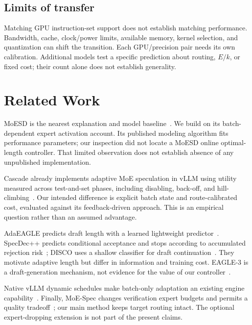\documentclass[10pt,twocolumn]{article}
\begin{document}
\subsection{Limits of transfer}
Matching GPU instruction-set support does not establish matching performance. Bandwidth, cache, clock/power limits, available memory, kernel selection, and quantization can shift the transition. Each GPU/precision pair needs its own calibration. Additional models test a specific prediction about routing, $E/k$, or fixed cost; their count alone does not establish generality.

\section{Related Work}
MoESD is the nearest explanation and model baseline~\cite{moesd}. We build on its batch-dependent expert activation account. Its published modeling algorithm fits performance parameters; our inspection did not locate a MoESD online optimal-length controller. That limited observation does not establish absence of any unpublished implementation.

Cascade already implements adaptive MoE speculation in vLLM using utility measured across test-and-set phases, including disabling, back-off, and hill-climbing~\cite{cascade}. Our intended difference is explicit batch state and route-calibrated cost, evaluated against its feedback-driven approach. This is an empirical question rather than an assumed advantage.

AdaEAGLE predicts draft length with a learned lightweight predictor~\cite{adaeagle}. SpecDec++ predicts conditional acceptance and stops according to accumulated rejection risk~\cite{specdecpp}; DISCO uses a shallow classifier for draft continuation~\cite{disco}. They motivate adaptive length but differ in information and training cost. EAGLE-3 is a draft-generation mechanism, not evidence for the value of our controller~\cite{eagle3}.

Native vLLM dynamic schedules make batch-only adaptation an existing engine capability~\cite{vllmdynamic,vllmconfig}. Finally, MoE-Spec changes verification expert budgets and permits a quality tradeoff~\cite{moespec}; our main method keeps target routing intact. The optional expert-dropping extension is not part of the present claims.
\end{document}
